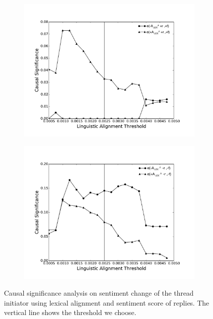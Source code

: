 \documentclass[man,biblatex,floatsintext]{apa6}
\begin{document}
\begin{figure}[!htb]
\begin{subfigure}{.5\textwidth}
  \centering
  \includegraphics[width=\linewidth]{Figures/posF05Lex20.pdf}
  \caption{\label{fig:posf05Lex}}
\end{subfigure}
\begin{subfigure}{.5\textwidth}
  \centering
  \includegraphics[width=\linewidth]{Figures/negF05Lex20.pdf}
  \caption{\label{fig:negf05Lex}}
\end{subfigure}
\caption{Causal significance analysis on sentiment change of the thread initiator using lexical alignment and sentiment score of replies. The vertical line shows the threshold we choose.}
\label{fig:Robust_Lex}
\end{figure}
\end{document}
